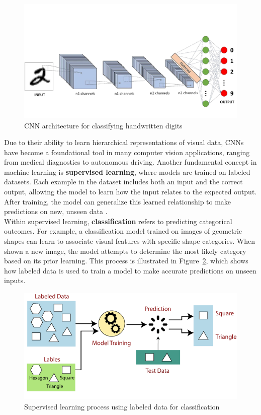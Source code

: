 \newpage

\begin{figure}[h!] \centering \includegraphics[width=0.75\linewidth]{figures/theory/machine-learning/convolutional-neural-network.png} \caption[Example of CNN architecture for handwritten digit classification]{CNN architecture for classifying handwritten digits \cite{medium:cnn}} \label{fig:convolutional-neural-network} \end{figure}


Due to their ability to learn hierarchical representations of visual data, CNNs have become a foundational tool in many computer vision applications, ranging from medical diagnostics to autonomous driving. Another fundamental concept in machine learning is \textbf{supervised learning}, where models are trained on labeled datasets. Each example in the dataset includes both an input and the correct output, allowing the model to learn how the input relates to the expected output. After training, the model can generalize this learned relationship to make predictions on new, unseen data \cite{geeksforgeeks:supervised-learning, google:supervised-learning}. \\

Within supervised learning, \textbf{classification} refers to predicting categorical outcomes. For example, a classification model trained on images of geometric shapes can learn to associate visual features with specific shape categories. When shown a new image, the model attempts to determine the most likely category based on its prior learning. This process is illustrated in Figure~\ref{fig:supervised-learning}, which shows how labeled data is used to train a model to make accurate predictions on unseen inputs. \\

\begin{figure}[h!] \centering \includegraphics[width=0.75\linewidth]{figures/theory/machine-learning/supervised-learning.png} \caption[Supervised Learning with labeled data]{Supervised learning process using labeled data for classification \cite{tpointtech:supervised-learning}} \label{fig:supervised-learning} \end{figure}

